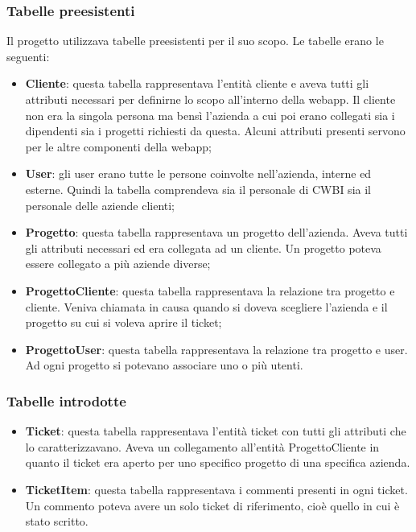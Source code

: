 \subsubsection*{Tabelle preesistenti}
Il progetto utilizzava tabelle preesistenti per il suo scopo. Le tabelle erano le seguenti: 
\begin{itemize}


    \item \textbf{Cliente}: questa tabella rappresentava l'entità cliente e aveva tutti gli attributi necessari per definirne lo scopo all'interno della webapp. Il cliente non era la singola persona ma bensì l'azienda a cui poi erano collegati sia i dipendenti sia i progetti richiesti da questa. Alcuni attributi presenti servono per le altre componenti della webapp;
    \item \textbf{User}: gli user erano tutte le persone coinvolte nell'azienda, interne ed esterne. Quindi la tabella comprendeva sia il personale di CWBI sia il personale delle aziende clienti;
    \item \textbf{Progetto}: questa tabella rappresentava un progetto dell'azienda. Aveva tutti gli attributi necessari ed era collegata ad un cliente. Un progetto poteva essere collegato a più aziende diverse;
    \item \textbf{ProgettoCliente}: questa tabella rappresentava la relazione tra progetto e cliente. Veniva chiamata in causa quando si doveva scegliere l'azienda e il progetto su cui si voleva aprire il ticket;
        \item \textbf{ProgettoUser}: questa tabella rappresentava la relazione tra progetto e user. Ad ogni progetto si potevano associare uno o più utenti.
\end{itemize}

\subsubsection*{Tabelle introdotte}
\begin{itemize}
	\item \textbf{Ticket}: questa tabella rappresentava l'entità ticket con tutti gli attributi che lo caratterizzavano. Aveva un collegamento all'entità ProgettoCliente in quanto il ticket era aperto per uno specifico progetto di una specifica azienda.
	
	\item \textbf{TicketItem}: questa tabella rappresentava i commenti presenti in ogni ticket. Un commento poteva avere un solo ticket di riferimento, cioè quello in cui è stato scritto.
\end{itemize}


